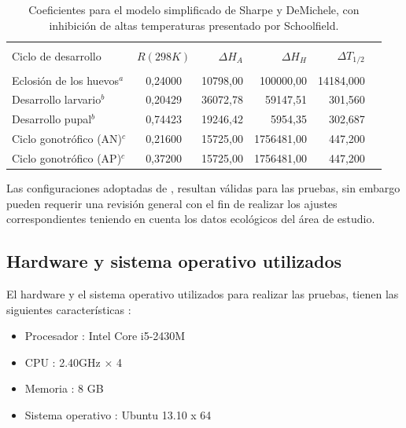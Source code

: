 \begin{table}[!htpb]
\begin{minipage}{\textwidth}
    \centering
    \caption{ \label{tab:coef-sharpe-demichele} Coeficientes para el modelo simplificado de Sharpe y DeMichele, con inhibición de altas temperaturas presentado por Schoolfield.}
    \begin{tabular}{p{6cm} c r r r r }
        \hline \\
        Ciclo de desarrollo    & $R(298K)$ & $\Delta H_{A}$ & $\Delta H_{H}$ & $\Delta T_{1/2}$  \\
        \hline
        \hline\\
        Eclosión de los huevos$^a$ & 0,24000 & 10798,00 &  100000,00  & 14184,000\\
        Desarrollo larvario$^b$    & 0,20429 & 36072,78 &   59147,51  &   301,560\\
        Desarrollo pupal$^b$       & 0,74423 & 19246,42 &    5954,35  &   302,687\\
        Ciclo gonotrófico (AN)$^c$ & 0,21600 & 15725,00 & 1756481,00  &   447,200\\
        Ciclo gonotrófico (AP)$^c$ & 0,37200 & 15725,00 & 1756481,00  &   447,200\\
    \end{tabular}
\end{minipage}
\end{table}

Las configuraciones adoptadas de
\cite{otero2006stochastic,otero2008stochastic,rueda1990temperature}, resultan válidas para las
pruebas, sin embargo pueden requerir una revisión general con el fin de realizar los ajustes
correspondientes teniendo en cuenta los datos ecológicos del área de estudio.

\subsection{Hardware y sistema operativo utilizados}
El hardware y el sistema operativo utilizados para realizar las pruebas, tienen las siguientes
características :
\begin{itemize}
\item Procesador : Intel Core i5-2430M
\item CPU : 2.40GHz × 4
\item Memoria : 8 GB
\item Sistema operativo : Ubuntu 13.10 x 64
\end{itemize}

